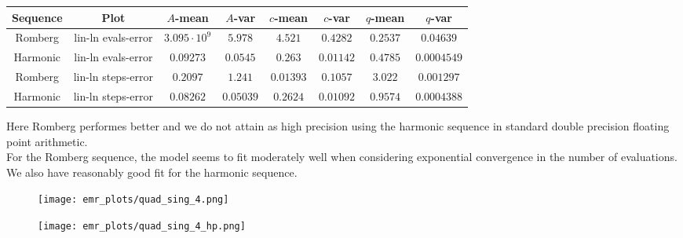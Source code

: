 \begin{table}[H]
    \centering
    \small
    \begin{tabular}{c|c||c|c|c|c|c|c}
Sequence & Plot & \(A\)-mean & \(A\)-var & \(c\)-mean & \(c\)-var & \(q\)-mean & \(q\)-var\\\hline
Romberg & lin-ln evals-error & \(3.095\cdot 10^9\) & \(5.978\) & \(4.521\) & \(0.4282\) & \(0.2537\) & \(0.04639\) \\
Harmonic & lin-ln evals-error & \(0.09273\) & \(0.0545\) & \(0.263\) & \(0.01142\) & \(0.4785\) & \(0.0004549\) \\
Romberg & lin-ln steps-error & \(0.2097\) & \(1.241\) & \(0.01393\) & \(0.1057\) & \(3.022\) & \(0.001297\) \\
Harmonic & lin-ln steps-error & \(0.08262\) & \(0.05039\) & \(0.2624\) & \(0.01092\) & \(0.9574\) & \(0.0004388\) \\
    \end{tabular}
    \label{tab:my_label}
\end{table}

Here Romberg performes better and we do not attain as high precision using the harmonic sequence in standard double precision floating point arithmetic.\\

For the Romberg sequence, the model seems to fit moderately well when considering exponential convergence in the number of evaluations. We also have reasonably good fit for the harmonic sequence.\\

\begin{figure}[H]
\centering
\begin{minipage}{0.45\textwidth}
\centering
\texttt{[image: emr\_plots/quad\_sing\_4.png]}
\end{minipage}
\begin{minipage}{0.45\textwidth}
\centering
\texttt{[image: emr\_plots/quad\_sing\_4\_hp.png]}
\end{minipage}
\end{figure}


